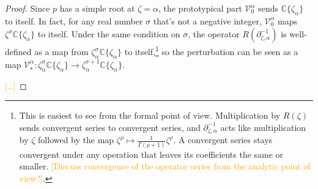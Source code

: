 \documentclass{article}
\newcommand{\maps}{\colon}
\newcommand{\C}{\mathbb{C}}
\newcommand{\hardpart}{\mathcal{V}_0}
\newcommand{\softpart}{\mathcal{V}_\star}
\newcommand{\hardker}{k_0}
\theoremstyle{definition}
\theoremstyle{plain}
\begin{document}
\begin{proof}




Since $p$ has a simple root at $\zeta = \alpha$, the prototypical part $\hardpart^\alpha$ sends $\C\{\zeta_\alpha\}$ to itself. In fact, for any real number $\sigma$ that's not a negative integer, $\hardpart^\alpha$ maps $\zeta^\sigma \C\{\zeta_\alpha\}$ to itself. Under the same condition on $\sigma$, the operator $R(\partial^{-1}_{\zeta, \alpha})$ is well-defined as a map from $\zeta_\alpha^\sigma \C\{\zeta_\alpha\}$ to itself,\footnote{This is easiest to see from the formal point of view. Multiplication by $R(\zeta)$ sends convergent series to convergent series, and $\partial^{-1}_{\zeta, \alpha}$ acts like multiplication by $\zeta$ followed by the map $\zeta^\rho \mapsto \tfrac{1}{\Gamma(\rho+1)} \zeta^\rho$. A convergent series stays convergent under any operation that leaves its coefficients the same or smaller. \textcolor{orange}{[Discuss convergence of the operator series from the analytic point of view?]}.} so the perturbation can be seen as a map $\softpart^\alpha \maps \zeta_\alpha^\sigma \C\{\zeta_\alpha\} \to \zeta_\alpha^{\sigma + 1} \C\{\zeta_\alpha\}$.

\textcolor{orange}{[\ldots]}

\end{proof}
\end{document}
